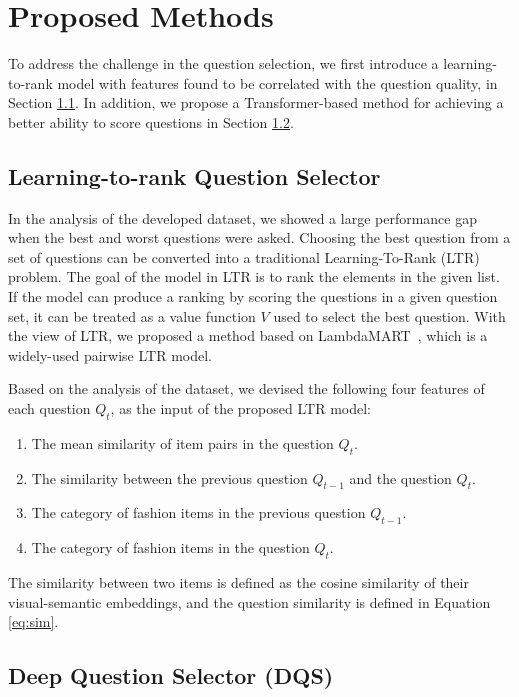 \chapter{Proposed Methods}
\label{sq:methods}

To address the challenge in the question selection, 
we first introduce a learning-to-rank model 
with features found to be correlated with the question quality, in Section \ref{sq:ltr}. 
In addition, we propose a Transformer-based method for achieving a better ability to score questions in Section \ref{sq:dqs}.

\section{Learning-to-rank Question Selector}
\label{sq:ltr}
In the analysis of the developed dataset, we showed a large performance gap when the best and worst questions were asked.
Choosing the best question from a set of questions can be converted into a traditional Learning-To-Rank (LTR) problem. 
The goal of the model in LTR is to rank the elements in the given list. If the model can produce a ranking by scoring the questions in a given question set, 
it can be treated as a value function $V$ used to select the best question.
With the view of LTR, we proposed a method based on LambdaMART~\cite{burges2010ranknet}, which is a widely-used pairwise LTR model.


Based on the analysis of the dataset, we devised the following four features of each question $Q_t$, 
as the input of the proposed LTR model:
\begin{enumerate}
    \item The mean similarity of item pairs in the question $Q_t$.
    \item The similarity between the previous question $Q_{t-1}$ and the question $Q_t$.
    \item The category of fashion items in the previous question $Q_{t-1}$.
    \item The category of fashion items in the question $Q_t$.
\end{enumerate}
The similarity between two items is defined as the cosine similarity of their visual-semantic embeddings,
and the question similarity is defined in Equation \ref{eq:sim}.

\section{Deep Question Selector (DQS)}
\label{sq:dqs}

